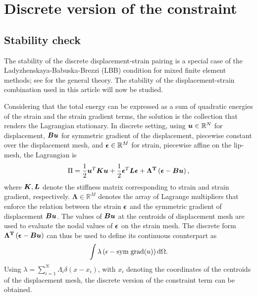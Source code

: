 \documentclass[10pt]{cas-sc}
\newenvironment{addedblock}
{\begingroup\color{blue!80}}
{\endgroup}
\begin{document}
\section{Discrete version of the constraint\label{discrete_version_of_gradient}}

\begin{addedblock}
\subsection{Stability check \label{stab_check_lip_disp}}
The stability of the discrete displacement-strain pairing is a special case of the Ladyzhenskaya-Babuska-Brezzi (LBB) condition for mixed finite element methods; see \cite{auricchio2017mixed} for the general theory. The stability of the displacement-strain combination used in this article will now be studied.

Considering that the total energy can be expressed as a sum of quadratic energies of the strain and the strain gradient terms, the solution is the collection that renders the Lagrangian stationary. In discrete setting, using $\mbox{\boldmath $u$} \in \mathbb{R} ^N$ for displacement, $\mbox{\boldmath $B$} \mbox{\boldmath $u$}$ for symmetric gradient of the displacement, piecewise constant over the displacement mesh, and $\mbox{\boldmath $\epsilon$} \in \mathbb{R}^M$ for strain, piecewise affine on the lip-mesh, the Lagrangian is
\begin{equation}
\Pi = \frac{1}{2} \mbox{\boldmath $u$} ^T \mbox{\boldmath $K$} \mbox{\boldmath $u$} + \frac{1}{2} \mbox{\boldmath $\epsilon$} ^T \mbox{\boldmath $L$} \mbox{\boldmath $\epsilon$} + \bf \Lambda ^T \left(\mbox{\boldmath $\epsilon$} - \mbox{\boldmath $B$} \mbox{\boldmath $u$} \right),
\end{equation}
where $\mbox{\boldmath $K$},\mbox{\boldmath $L$} $ denote the stiffness matrix corresponding to strain and strain gradient, respectively. $\mathbf{\Lambda} \in \mathbb{R}^M$ denotes the array of Lagrange multipliers that enforce the relation between the strain $\mbox{\boldmath $\epsilon$}$ and the symmetric gradient of displacement $\mbox{\boldmath $B$} \mbox{\boldmath $u$}$. The values of $\mbox{\boldmath $B$} \mbox{\boldmath $u$}$ at the centroids of displacement mesh are used to evaluate the nodal values of $\mbox{\boldmath $\epsilon$} $ on the strain mesh. The discrete form $\bf \Lambda ^T \left(\mbox{\boldmath $\epsilon$} - \mbox{\boldmath $B$} \mbox{\boldmath $u$} \right)$ can thus be used to define its continuous counterpart as
\begin{equation}
 \int \lambda \left( {\epsilon} - {\rm sym \; grad}(u) \right) \mathop{}\!\mathrm{d} \Omega.
\end{equation}
Using $\lambda = \sum_{i=1}^{N} \Lambda_i \delta (x-x_i) $, with $x_i$ denoting the coordinates of the centroids of the displacement mesh, the discrete version of the constraint term can be obtained.



\end{addedblock}
\end{document}
